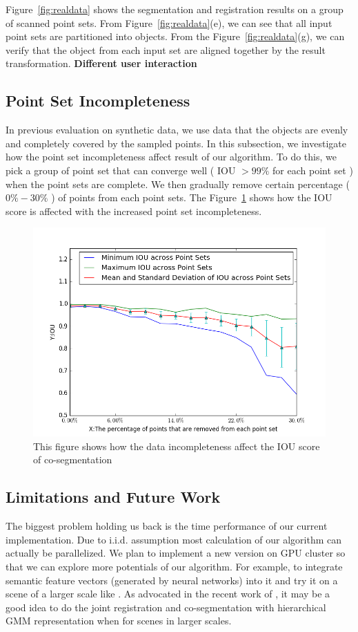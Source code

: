 Figure~{\ref{fig:realdata}} shows the segmentation and registration results on a group of scanned point sets.
From Figure~\ref{fig:realdata}(e), we can see that all input point sets are partitioned into objects. From the Figure~\ref{fig:realdata}(g), we can verify that the object from each input set are aligned together by the result transformation.  
\textbf{Different user interaction}
\subsection{Point Set Incompleteness}
In previous evaluation on synthetic data, we use data that the objects are evenly and completely covered by the sampled points. In this subsection, we investigate how the point set incompleteness affect result of our algorithm. To do this, we pick a group of point set that can converge well ( IOU $> 99\%$ for each point set ) when the point sets are complete. We then gradually remove certain percentage ( $0\%-30\%$ ) of points from each point sets. The Figure~\ref{fig:incompleteness} shows how the IOU score is affected with the increased point set incompleteness.
\begin{figure}[htb]
	\centering
	\includegraphics[width=\linewidth]{images/incompleteness/IOU.png}
	\caption{This figure shows how the data incompleteness affect the IOU score of co-segmentation}
	\label{fig:incompleteness}
\end{figure}

\subsection{Limitations and Future Work}
The biggest problem holding us back is the time performance of our current implementation.  Due to i.i.d. assumption most calculation of our algorithm can actually be parallelized. We plan to implement a new version on GPU cluster so that we can explore more potentials of our algorithm. 
For example, to integrate semantic feature vectors (generated by neural networks) into it and try it on a scene of a larger scale like \cite{GOGMA}. 
As advocated in the recent work of \cite{AGM}, it may be a good idea to do the joint registration and co-segmentation with hierarchical GMM representation when for scenes in larger scales. 